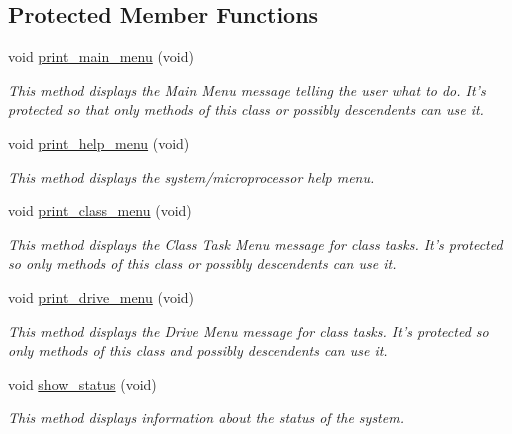 \subsection*{Protected Member Functions}
\begin{DoxyCompactItemize}
\item 
\hypertarget{classtask__user_a36c99836d2ee036858d4a0ab61c2d5ec}{void \hyperlink{classtask__user_a36c99836d2ee036858d4a0ab61c2d5ec}{print\-\_\-main\-\_\-menu} (void)}\label{classtask__user_a36c99836d2ee036858d4a0ab61c2d5ec}

\begin{DoxyCompactList}\small\item\em This method displays the Main Menu message telling the user what to do. It's protected so that only methods of this class or possibly descendents can use it. \end{DoxyCompactList}\item 
\hypertarget{classtask__user_a7084e5c56f20acfcca038e2b85145c7a}{void \hyperlink{classtask__user_a7084e5c56f20acfcca038e2b85145c7a}{print\-\_\-help\-\_\-menu} (void)}\label{classtask__user_a7084e5c56f20acfcca038e2b85145c7a}

\begin{DoxyCompactList}\small\item\em This method displays the system/microprocessor help menu. \end{DoxyCompactList}\item 
\hypertarget{classtask__user_af45c9040fde8e24ca8d0eb64298b301b}{void \hyperlink{classtask__user_af45c9040fde8e24ca8d0eb64298b301b}{print\-\_\-class\-\_\-menu} (void)}\label{classtask__user_af45c9040fde8e24ca8d0eb64298b301b}

\begin{DoxyCompactList}\small\item\em This method displays the Class Task Menu message for class tasks. It's protected so only methods of this class or possibly descendents can use it. \end{DoxyCompactList}\item 
\hypertarget{classtask__user_acefdd2e0f766f8467e2adf20ce7cfeec}{void \hyperlink{classtask__user_acefdd2e0f766f8467e2adf20ce7cfeec}{print\-\_\-drive\-\_\-menu} (void)}\label{classtask__user_acefdd2e0f766f8467e2adf20ce7cfeec}

\begin{DoxyCompactList}\small\item\em This method displays the Drive Menu message for class tasks. It's protected so only methods of this class and possibly descendents can use it. \end{DoxyCompactList}\item 
void \hyperlink{classtask__user_a105bebbd9cb1031154c3dfc3662db4a0}{show\-\_\-status} (void)
\begin{DoxyCompactList}\small\item\em This method displays information about the status of the system. \end{DoxyCompactList}\end{DoxyCompactItemize}



